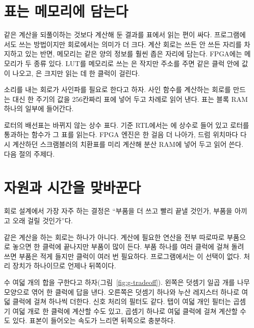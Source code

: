 \section{표는 메모리에 담는다}

\Why 같은 계산을 되풀이하는 것보다 계산해 둔 결과를 표에서 읽는 편이 싸다. 프로그램에서도 쓰는 방법이지만
회로에서는 의미가 더 크다. 계산 회로는 쓰든 안 쓰든 자리를 차지하고 있는 반면, 메모리는 같은 양의 정보를
훨씬 좁은 자리에 담는다. FPGA에는 메모리가 두 종류 있다. LUT를 메모리로 쓰는 은 작지만 주소를 주면 같은 클럭 안에 값이 나오고, 은 크지만 읽는 데 한 클럭이
걸린다.

\General 소리를 내는 회로가 사인파를 필요로 한다고 하자. 사인 함수를 계산하는 회로를 만드는 대신 한 주기의
값을 256칸짜리 표에 넣어 두고 차례로 읽어 낸다. 표는 블록 RAM 하나의 일부에 들어간다.

\Ours 로터의 배선표는 바뀌지 않는 상수 표다. 기준 RTL에서는 에 상수로 들어 있고
로터를 통과하는 함수가 그 표를 읽는다. FPGA 엔진은 한 걸음 더 나아가, 드럼 위치마다 다시 계산하던
스크램블러의 치환표를 미리 계산해 분산 RAM에 넣어 두고 읽어 쓴다. 다음 절의 주제다.

\section{자원과 시간을 맞바꾼다}\label{sec:tradeoff}

회로 설계에서 가장 자주 하는 결정은 ``부품을 더 쓰고 빨리 끝낼 것인가, 부품을 아끼고 오래 걸릴 것인가''다.

\Why 같은 계산을 하는 회로는 하나가 아니다. 계산에 필요한 연산을 전부 따로따로 부품으로 놓으면 한 클럭에
끝나지만 부품이 많이 든다. 부품 하나를 여러 클럭에 걸쳐 돌려 쓰면 부품은 적게 들지만 클럭이 여러 번
필요하다. 프로그램에서는 이 선택이 없다. 처리 장치가 하나이므로 언제나 뒤쪽이다.

\General 수 여덟 개의 합을 구한다고 하자(그림~\ref{fig:g-tradeoff}). 왼쪽은 덧셈기 일곱 개를 나무 모양으로
엮어 한 클럭에 답을 낸다. 오른쪽은 덧셈기 하나와 누산 레지스터 하나로 여덟 클럭에 걸쳐 하나씩 더한다.
신호 처리의 필터도 같다. 탭이 여덟 개인 필터는 곱셈기 여덟 개로 한 클럭에 계산할 수도 있고, 곱셈기 하나로
여덟 클럭에 걸쳐 계산할 수도 있다. 표본이 들어오는 속도가 느리면 뒤쪽으로 충분하다.

